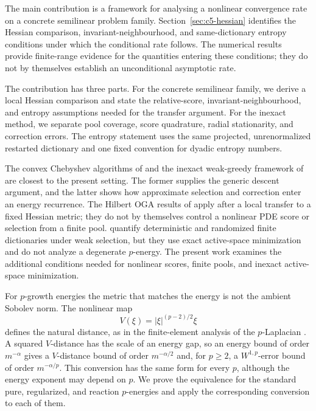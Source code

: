 The main contribution is a framework for analysing a nonlinear convergence rate on a
concrete semilinear problem family. Section~\ref{sec:c5-hessian} identifies the
Hessian comparison, invariant-neighbourhood, and same-dictionary entropy conditions
under which the conditional rate follows. The numerical results provide finite-range
evidence for the quantities entering these conditions; they do not by themselves
establish an unconditional asymptotic rate.

The contribution has three parts. For the concrete semilinear family, we derive a
local Hessian comparison and state the relative-score, invariant-neighbourhood, and
entropy assumptions needed for the transfer argument. For the inexact method, we
separate pool coverage, score quadrature, radial stationarity, and correction errors.
The entropy statement uses the same projected, unrenormalized restarted dictionary
and one fixed convention for dyadic entropy numbers.

The convex Chebyshev algorithms of \citet{TemlyakovCGA2013,TemlyakovGreedy2014} and the inexact
weak-greedy framework of \citet{DereventsovTemlyakov2022} are closest to the present setting. The
former supplies the generic descent argument, and the latter shows how approximate selection and
correction enter an energy recurrence. The Hilbert OGA results of
\citet{SiegelXuOGA2022,LiSiegelEntropy2024} apply after a local transfer to a fixed Hessian metric;
they do not by themselves control a nonlinear PDE score or selection from a finite pool.
\citet{XuXu2025} quantify deterministic and randomized finite dictionaries under weak selection, but
they use exact active-space minimization and do not analyze a degenerate \(p\)-energy. The present
work examines the additional conditions needed for nonlinear scores, finite pools, and inexact
active-space minimization.

For \(p\)-growth energies the metric that matches the energy is not the ambient Sobolev norm. The
nonlinear map
\[
  V(\xi)=|\xi|^{(p-2)/2}\xi
\]
defines the natural distance, as in the finite-element analysis of the \(p\)-Laplacian
\citep{BarrettLiu1993,DieningKreuzer2008,LeePark2025}. A squared \(V\)-distance has the scale of an
energy gap, so an energy bound of order \(m^{-\alpha}\) gives a \(V\)-distance bound of order
\(m^{-\alpha/2}\) and, for \(p\geq2\), a \(W^{1,p}\)-error bound of order \(m^{-\alpha/p}\). This
conversion has the same form for every \(p\), although the energy exponent may depend on \(p\). We
prove the equivalence for the standard pure, regularized, and reaction \(p\)-energies and apply the
corresponding conversion to each of them.

